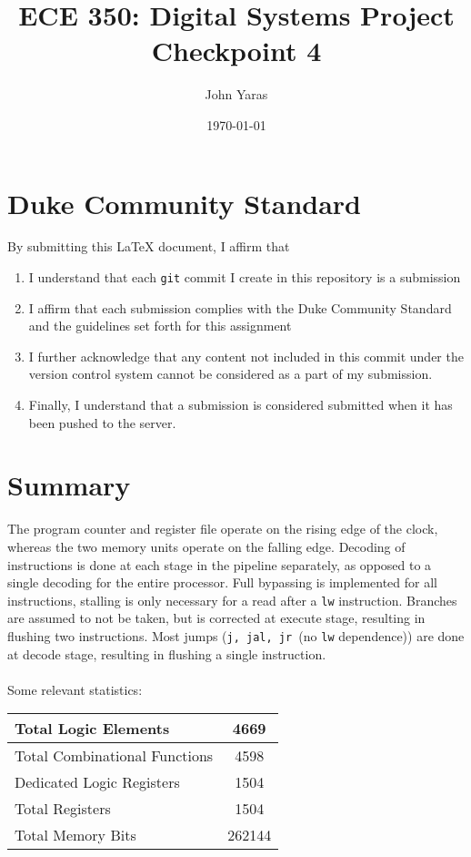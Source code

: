 \documentclass[letterpaper]{article} %
\begin{document}
\title{ECE 350: Digital Systems Project Checkpoint 4}
\author{John Yaras} %
\date{\today} %
\maketitle

\section*{Duke Community Standard}

By submitting this \LaTeX{} document, I affirm that
\begin{enumerate}
    \item I understand that each \texttt{git} commit I create in this repository is a submission
    \item I affirm that each submission complies with the Duke Community Standard and the guidelines set forth for this assignment
    \item I further acknowledge that any content not included in this commit under the version control system cannot be considered as a part of my submission.
    \item Finally, I understand that a submission is considered submitted when it has been pushed to the server.
\end{enumerate} 

\section*{Summary}
The program counter and register file operate on the rising edge of the clock, whereas the two memory units operate on the falling edge. Decoding of instructions is done at each stage in the pipeline separately, as opposed to a single decoding for the entire processor. Full bypassing is implemented for all instructions, stalling is only necessary for a read after a \texttt{lw} instruction. Branches are assumed to not be taken, but is corrected at execute stage, resulting in flushing two instructions. Most jumps (\texttt{j, jal, jr }(no \texttt{lw} dependence)) are done at decode stage, resulting in flushing a single instruction.\\~\\
Some relevant statistics:
\begin{center}
\begin{tabular}{|l|c|} \hline
Total Logic Elements & 4669 \\ \hline
Total Combinational Functions & 4598 \\ \hline
Dedicated Logic Registers & 1504 \\ \hline
Total Registers & 1504 \\ \hline
Total Memory Bits & 262144 \\ \hline
\end{tabular}
\end{center}
\end{document}
